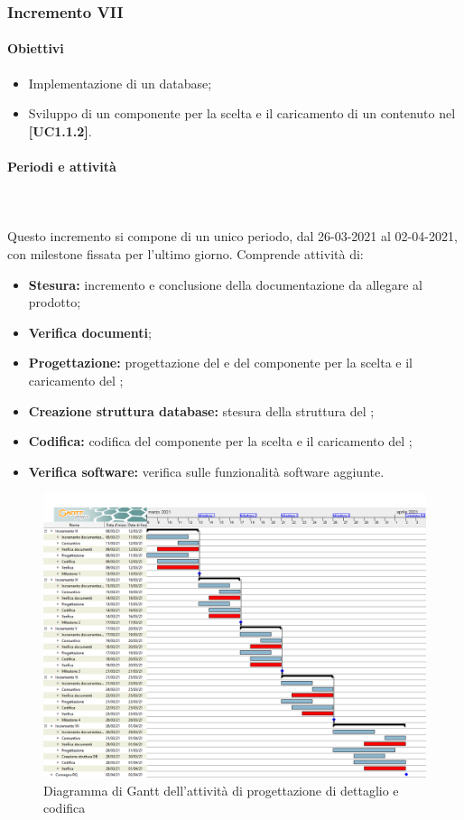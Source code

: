\newpage
\subsubsection{Incremento VII}

\paragraph{Obiettivi}
\begin{itemize}
\item Implementazione di un database;
\item Sviluppo di un componente per la scelta e il caricamento di un  contenuto nel  \textbf{[UC1.1.2]}.
\end{itemize}

\paragraph{Periodi e attività} \mbox{}\\\mbox{}\\
Questo incremento si compone di un unico periodo, dal 26-03-2021 al 02-04-2021, con milestone fissata per l'ultimo giorno. Comprende attività di:
\begin{itemize}
\item \textbf{Stesura:} incremento e conclusione della documentazione da allegare al prodotto;
\item \textbf{Verifica documenti};
\item \textbf{Progettazione:} progettazione del  e del componente per la scelta e il caricamento del ;
\item \textbf{Creazione struttura database:} stesura della struttura del ;
\item \textbf{Codifica:} codifica del componente per la scelta e il caricamento del ;
\item \textbf{Verifica software:} verifica sulle funzionalità software aggiunte.
\end{itemize}

\begin{landscape}

\begin{figure}[h]
 	\centering
	\includegraphics[width=\linewidth]{Images/GanttPianificazioneProgettazioneDettaglioCodifica.png}
	\caption{Diagramma di Gantt dell'attività di progettazione di dettaglio e codifica}
\end{figure}

\end{landscape}